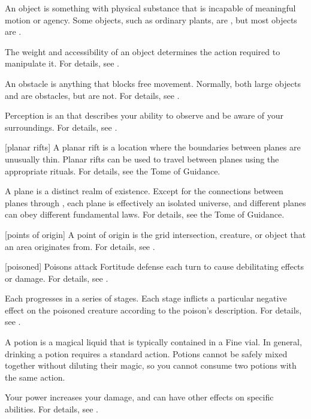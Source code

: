  An object is something with physical substance that is incapable of meaningful motion or agency.
Some objects, such as ordinary plants, are , but most objects are .

 The weight and accessibility of an object determines the action required to manipulate it.
For details, see .

 An obstacle is anything that blocks free movement.
Normally, both large objects and  are obstacles, but  are not.
For details, see .

 Perception is an  that describes your ability to observe and be aware of your surroundings.
For details, see .

[planar rifts] A planar rift is a location where the boundaries between planes are unusually thin.
Planar rifts can be used to travel between planes using the appropriate rituals.
For details, see the Tome of Guidance.

 A plane is a distinct realm of existence.
Except for the connections between planes through , each plane is effectively an isolated universe, and different planes can obey different fundamental laws.
For details, see the Tome of Guidance.

[points of origin] A point of origin is the grid intersection, creature, or object that an area originates from.
For details, see .

[poisoned] Poisons attack Fortitude defense each turn to cause debilitating effects or damage.
For details, see .

 Each  progresses in a series of stages.
Each stage inflicts a particular negative effect on the poisoned creature according to the poison's description.
For details, see .

 A potion is a magical liquid that is typically contained in a Fine vial.
In general, drinking a potion requires a standard action.
Potions cannot be safely mixed together without diluting their magic, so you cannot consume two potions with the same action.

 Your power increases your damage, and can have other effects on specific abilities.
For details, see .

